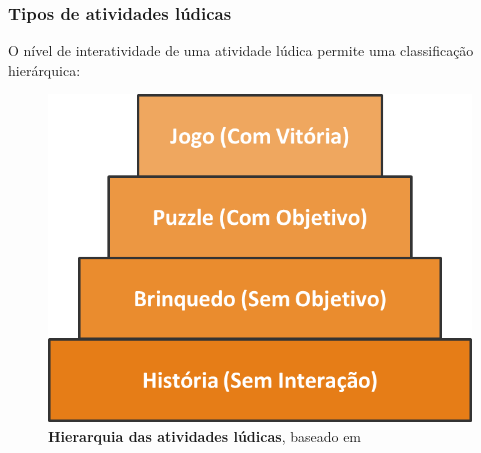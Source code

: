 \expandafter\documentclass\expandafter[table, usenames, svgnames, dvipsnames, \classopts]{beamer}
\begin{document}
\begin{frame} 
	\frametitle{\textbf{Tipos de atividades lúdicas}}

	O nível de interatividade de uma atividade lúdica permite uma classificação hierárquica:
	
    \begin{figure}
	    \centering
   		\includegraphics[height=0.5\paperheight]{types-of-play}
        \caption{\textbf{Hierarquia das atividades lúdicas}, baseado em \cite{Fullerton2008}}
    \end{figure}

\end{frame}
\end{document}
